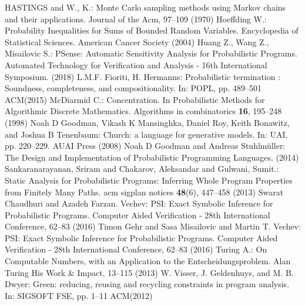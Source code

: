 \documentclass[runningheads]{llncs}
\begin{document}
\begin{thebibliography}{8}
HASTINGS and W., K.: Monte Carlo sampling methods using Markov chains and their applications. Journal of the Acm, 97--109 (1970)
Hoeffding W.: Probability Inequalities for Sums of Bounded Random Variables. Encyclopedia of Statistical Sciences. American Cancer Society (2004)
Huang Z., Wang Z., Misailovic S.: PSense: Automatic Sensitivity Analysis for Probabilistic Programs. Automated Technology for Verification and Analysis - 16th International Symposium. (2018)
L.M.F. Fioriti, H. Hermanns: Probabilistic termination : Soundness, completeness, and compositionality. In: POPL, pp. 489--501 ACM(2015)
McDiarmid C.: Concentration. In Probabilistic Methods for Algorithmic Discrete Mathematics. Algorithms in combinatorics \textbf{16}, 195--248 (1998)
Noah D Goodman, Vikash K Mansinghka, Daniel Roy, Keith Bonawitz, and Joshua B Tenenbaum: Church: a language for generative models. In: UAI, pp. 220--229. AUAI Press (2008)
Noah D Goodman and Andreas Stuhlmüller: The Design and
Implementation of Probabilistic Programming Languages. (2014)
Sankaranarayanan, Sriram and Chakarov, Aleksandar and Gulwani, Sumit.: Static Analysis for Probabilistic Programs: Inferring Whole Program Properties from Finitely Many Paths. acm sigplan notices \textbf{48}(6), 447--458 (2013)
Swarat Chaudhuri and Azadeh Farzan. Vechev: {PSI:} Exact Symbolic Inference for Probabilistic Programs. Computer Aided Verification - 28th International Conference, 62--83 (2016)
Timon Gehr and Sasa Misailovic and Martin T. Vechev: {PSI:} Exact Symbolic Inference for Probabilistic Programs. Computer Aided Verification - 28th International Conference, 62--83 (2016)
Turing A.: On Computable Numbers, with an Application to the Entscheidungsproblem. Alan Turing His Work \& Impact, 13--115 (2013)
W. Visser, J. Geldenhuys, and M. B. Dwyer: Green: reducing, reusing and recycling constraints in program analysis. In: SIGSOFT FSE, pp. 1--11 ACM(2012)
\end{thebibliography}
\end{document}
